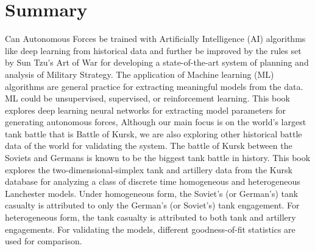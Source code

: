 \documentclass[]{article}
\begin{document}
\section*{Summary}
\justifying
Can \Gls{Autonomous Forces} be trained with Artificially Intelligence (AI) algorithms like \Gls{deep learning} from historical data and further be improved by the rules set by \Gls{Sun Tzu's Art of War} for developing a state-of-the-art system of planning and analysis of \Gls{Military Strategy}. The application of Machine learning (ML) algorithms are general practice for extracting meaningful models from the data. ML could be unsupervised, supervised, or reinforcement learning. This book explores deep learning neural networks for extracting model parameters for generating autonomous forces, Although our main focus is on the world's largest tank battle that is Battle of Kursk, we are also exploring other historical battle data of the world for validating the system.  
The battle of Kursk between the Soviets and Germans is known to be the biggest tank battle in history. This book explores the two-dimensional-simplex tank and artillery data from the Kursk database for analyzing a class of discrete time homogeneous and heterogeneous Lanchester models. Under homogeneous form, the Soviet’s (or German’s) tank casualty is attributed to only the German’s (or Soviet’s) tank engagement. For heterogeneous form, the tank casualty is attributed to both tank and artillery engagements. For validating the models, different goodness-of-fit statistics are used for comparison. 
\newpage




\tableofcontents
\newpage
\scriptsize
\listoffigures
\newpage
\listoftables
\newpage
 \thispagestyle{empty}
\normalsize
\end{document}
